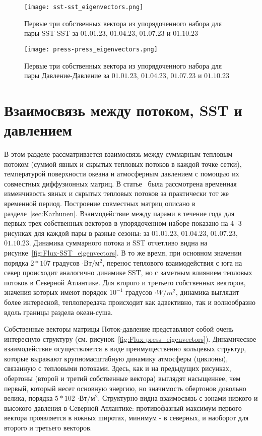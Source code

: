 \begin{figure}
	\centering
	\texttt{[image: sst-sst\_eigenvectors.png]}
	\caption{Первые три собственных вектора из упорядоченного набора для пары SST-SST за $01.01.23$, $01.04.23$, $01.07.23$ и $01.10.23$}
	\label{fig:SST-SST_eigenvectors}
\end{figure}

\begin{figure}
	\centering
	\texttt{[image: press-press\_eigenvectors.png]}
	\caption{Первые три собственных вектора из упорядоченного набора для пары Давление-Давление за $01.01.23$, $01.04.23$, $01.07.23$ и $01.10.23$}
	\label{fig:press-press_eigenvectors}
\end{figure}

\section{Взаимосвязь между потоком, SST и давлением}
В этом разделе рассматривается взаимосвязь между суммарным тепловым потоком (суммой явных и скрытых тепловых потоков в каждой точке сетки), температурой поверхности океана и атмосферным давлением с помощью их совместных диффузионных матриц. В статье~\cite{gorshenin2023stochastic} была рассмотрена временная изменчивость явных и скрытых тепловых потоков за практически тот же временной период. Построение совместных матриц описано в разделе~\ref{sec:Karhunen}. Взаимодействие между парами в течение года для первых трех собственных векторов в упорядоченном наборе показано на $4 \cdot 3$ рисунках для каждой пары в разные сезоны: за $01.01.23$, $01.04.23$, $01.07.23$, $01.10.23$. Динамика суммарного потока и SST отчетливо видна на рисунке~\ref{fig:Flux-SST_eigenvectors}. В то же время, при основном значении порядка $2*107$ градусов $\cdot Вт/м^2$, перенос теплового взаимодействия с юга на север происходит аналогично динамике SST, но с заметным влиянием тепловых потоков в Северной Атлантике. Для второго и третьего собственных векторов, значения которых имеют порядок $10^{-1}$ градусов $\cdot W/m^2$, динамика выглядит более интересной, теплопередача происходит как адвективно, так и волнообразно вдоль границы раздела океан-суша.

Собственные векторы матрицы Поток-давление представляют собой очень интересную структуру (см. рисунок~\ref{fig:Flux-press_eigenvectors}). Динамическое взаимодействие осуществляется в виде преимущественно кольцевых структур, которые выражают крупномасштабную динамику атмосферы (циклоны), связанную с тепловыми потоками. Здесь, как и на предыдущих рисунках, обертоны (второй и третий собственные вектора) выглядят насыщеннее, чем первый, который несет основную энергию, но значимость обертонов довольно велика, порядка $5*102$ $\cdot Вт/м^2$. Структурно видна взаимосвязь с зонами низкого и высокого давления в Северной Атлантике: противофазный максимум первого вектора проявляется в южных широтах, минимум - в северных, и наоборот для второго и третьего векторов.

